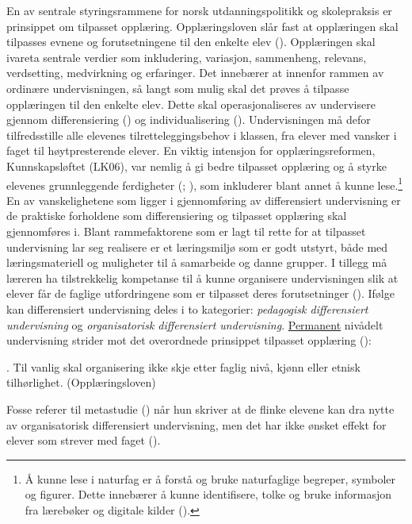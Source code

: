 \documentclass[main.tex]{subfiles}
\begin{document}
En av sentrale styringsrammene for norsk utdanningspolitikk og skolepraksis er prinsippet om tilpasset opplæring. Opplæringsloven slår fast at opplæringen skal tilpasses evnene og forutsetningene til den enkelte elev (). Opplæringen skal ivareta sentrale verdier som inkludering, variasjon, sammenheng, relevans, verdsetting, medvirkning og erfaringer. Det innebærer at innenfor rammen av ordinære undervisningen, så langt som mulig skal det prøves å tilpasse opplæringen til den enkelte elev. Dette skal operasjonaliseres av undervisere gjennom differensiering () og individualisering (). Undervisningen må defor tilfredsstille alle elevenes tilretteleggingsbehov i klassen, fra elever med vansker i faget til høytpresterende elever. En viktig intensjon for opplæringsreformen, Kunnskapsløftet (LK06), var nemlig å gi bedre tilpasset opplæring og å styrke elevenes grunnleggende ferdigheter (; ), som inkluderer blant annet å kunne lese.\footnote{Å kunne lese i naturfag er å forstå og bruke naturfaglige begreper, symboler og figurer. Dette innebærer å kunne identifisere, tolke og bruke informasjon fra lærebøker og digitale kilder ().}
\newline\newline
En av vanskelighetene som ligger i gjennomføring av differensiert undervisning er de praktiske forholdene som differensiering og tilpasset opplæring skal gjennomføres i. Blant rammefaktorene som er lagt til rette for at tilpasset undervisning lar seg realisere er et læringsmiljø som er godt utstyrt, både med læringsmateriell og muligheter til å samarbeide og danne grupper. I tillegg må læreren ha tilstrekkelig kompetanse til å kunne organisere undervisningen  slik at elever får de faglige utfordringene som er tilpasset deres forutsetninger ().
\newline\newline
Ifølge  kan differensiert undervisning deles i to kategorier: \emph{pedagogisk differensiert undervisning} og \emph{organisatorisk differensiert undervisning}. \underline{Permanent} nivådelt undervisning strider mot det overordnede prinsippet tilpasset opplæring ():
\begin{displayquote}
\textelp{}. Til vanlig skal organisering ikke skje etter faglig nivå, kjønn eller etnisk tilhørlighet. (Opplæringsloven)
\end{displayquote}
Fosse referer til metastudie () når hun skriver at de flinke elevene kan dra nytte av organisatorisk differensiert undervisning, men det har ikke ønsket effekt for elever som strever med faget (). 
\end{document}
